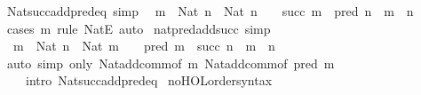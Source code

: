 \begin{isabellebody}
\endisatagproof
{\isafoldproof}%
%
\isadelimproof
\isanewline
%
\endisadelimproof
\isanewline
{}\isamarkupfalse%
\ Nat{\isacharunderscore}{\kern0pt}succ{\isacharunderscore}{\kern0pt}add{\isacharunderscore}{\kern0pt}pred{\isacharunderscore}{\kern0pt}eq\ {\isacharbrackleft}{\kern0pt}simp{\isacharbrackright}{\kern0pt}{\isacharcolon}{\kern0pt}\isanewline
\ \ {\isachardoublequoteopen}{\isasymlbrakk}m\ {\isacharcolon}{\kern0pt}\ Nat{\isacharsemicolon}{\kern0pt}\ n\ {\isacharcolon}{\kern0pt}\ Nat{\isacharsemicolon}{\kern0pt}\ n\ {\isasymnoteq}\ {}{\isasymrbrakk}\ {\isasymLongrightarrow}\ succ\ m\ {\isacharplus}{\kern0pt}\ pred\ n\ {\isacharequal}{\kern0pt}\ m\ {\isacharplus}{\kern0pt}\ n{\isachardoublequoteclose}\isanewline
%
\isadelimproof
\ \ %
\endisadelimproof
%
\isatagproof
{}\isamarkupfalse%
\ {\isacharparenleft}{\kern0pt}cases\ m\ rule{\isacharcolon}{\kern0pt}\ NatE{\isacharparenright}{\kern0pt}\ auto%
\endisatagproof
{\isafoldproof}%
%
\isadelimproof
\isanewline
%
\endisadelimproof
\isanewline
{}\isamarkupfalse%
\ nat{\isacharunderscore}{\kern0pt}pred{\isacharunderscore}{\kern0pt}add{\isacharunderscore}{\kern0pt}succ\ {\isacharbrackleft}{\kern0pt}simp{\isacharbrackright}{\kern0pt}{\isacharcolon}{\kern0pt}\isanewline
\ \ {\isachardoublequoteopen}{\isasymlbrakk}m\ {\isacharcolon}{\kern0pt}\ Nat{\isacharsemicolon}{\kern0pt}\ n\ {\isacharcolon}{\kern0pt}\ Nat{\isacharsemicolon}{\kern0pt}\ m\ {\isasymnoteq}\ {}{\isasymrbrakk}\ {\isasymLongrightarrow}\ pred\ m\ {\isacharplus}{\kern0pt}\ succ\ n\ {\isacharequal}{\kern0pt}\ m\ {\isacharplus}{\kern0pt}\ n{\isachardoublequoteclose}\isanewline
%
\isadelimproof
\ \ %
\endisadelimproof
%
\isatagproof
{}\isamarkupfalse%
\ {\isacharparenleft}{\kern0pt}auto\ simp\ only{\isacharcolon}{\kern0pt}\ Nat{\isacharunderscore}{\kern0pt}add{\isacharunderscore}{\kern0pt}comm{\isacharbrackleft}{\kern0pt}of\ m{\isacharbrackright}{\kern0pt}\ Nat{\isacharunderscore}{\kern0pt}add{\isacharunderscore}{\kern0pt}comm{\isacharbrackleft}{\kern0pt}of\ {\isachardoublequoteopen}pred\ m{\isachardoublequoteclose}{\isacharbrackright}{\kern0pt}\isanewline
\ \ \ \ intro{\isacharcolon}{\kern0pt}\ Nat{\isacharunderscore}{\kern0pt}succ{\isacharunderscore}{\kern0pt}add{\isacharunderscore}{\kern0pt}pred{\isacharunderscore}{\kern0pt}eq{\isacharparenright}{\kern0pt}%
\endisatagproof
{\isafoldproof}%
%
\isadelimproof
\isanewline
%
\endisadelimproof
\isanewline
{}\isamarkupfalse%
\ no{\isacharunderscore}{\kern0pt}HOL{\isacharunderscore}{\kern0pt}order{\isacharunderscore}{\kern0pt}syntax\isanewline

\end{isabellebody}
